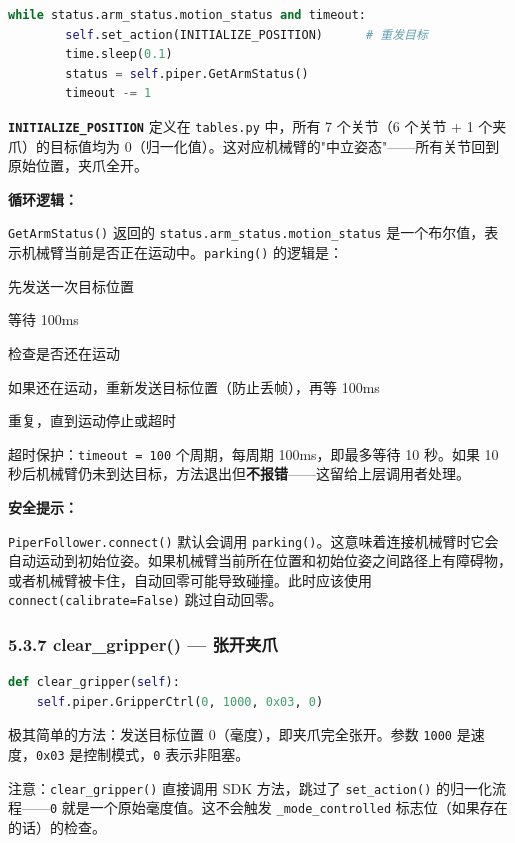 \documentclass[UTF8,a4paper,11pt]{ctexart}
\begin{document}
{\begin{lstlisting}[language=python]
    while status.arm_status.motion_status and timeout:
        self.set_action(INITIALIZE_POSITION)      # 重发目标
        time.sleep(0.1)
        status = self.piper.GetArmStatus()
        timeout -= 1
\end{lstlisting}

\textbf{\texttt{INITIALIZE_POSITION}} 定义在 \texttt{tables.py} 中，所有 7 个关节（6 个关节 + 1 个夹爪）的目标值均为 0（归一化值）。这对应机械臂的"中立姿态"——所有关节回到原始位置，夹爪全开。

\textbf{循环逻辑：}

\texttt{GetArmStatus()} 返回的 \texttt{status.arm_status.motion_status} 是一个布尔值，表示机械臂当前是否正在运动中。\texttt{parking()} 的逻辑是：
\item[1] 先发送一次目标位置
\item[2] 等待 100ms
\item[3] 检查是否还在运动
\item[4] 如果还在运动，重新发送目标位置（防止丢帧），再等 100ms
\item[5] 重复，直到运动停止或超时

超时保护：\texttt{timeout = 100} 个周期，每周期 100ms，即最多等待 10 秒。如果 10 秒后机械臂仍未到达目标，方法退出但\textbf{不报错}——这留给上层调用者处理。

\textbf{安全提示：}

\texttt{PiperFollower.connect()} 默认会调用 \texttt{parking()}。这意味着连接机械臂时它会自动运动到初始位姿。如果机械臂当前所在位置和初始位姿之间路径上有障碍物，或者机械臂被卡住，自动回零可能导致碰撞。此时应该使用 \texttt{connect(calibrate=False)} 跳过自动回零。

\subsubsection{5.3.7 clear_gripper() — 张开夹爪}

\begin{lstlisting}[language=python]
def clear_gripper(self):
    self.piper.GripperCtrl(0, 1000, 0x03, 0)
\end{lstlisting}

极其简单的方法：发送目标位置 0（毫度），即夹爪完全张开。参数 \texttt{1000} 是速度，\texttt{0x03} 是控制模式，\texttt{0} 表示非阻塞。

注意：\texttt{clear_gripper()} 直接调用 SDK 方法，跳过了 \texttt{set_action()} 的归一化流程——\texttt{0} 就是一个原始毫度值。这不会触发 \texttt{_mode_controlled} 标志位（如果存在的话）的检查。

}
\end{document}
